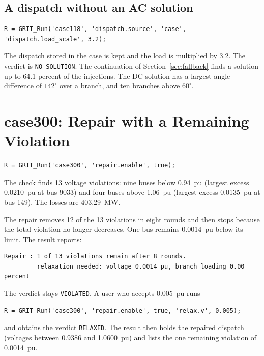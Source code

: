 \documentclass[a4paper,11pt]{article}
\begin{document}
\subsection{A dispatch without an AC solution}

\begin{lstlisting}
R = GRIT_Run('case118', 'dispatch.source', 'case', 'dispatch.load_scale', 3.2);
\end{lstlisting}

The dispatch stored in the case is kept and the load is multiplied by 3.2. The verdict is \texttt{NO\_SOLUTION}. The continuation of Section~\ref{sec:fallback} finds a solution up to 64.1 percent of the injections. The DC solution has a largest angle difference of $142^\circ$ over a branch, and ten branches above $60^\circ$.

\section{case300: Repair with a Remaining Violation}\label{sec:ex300}

\begin{lstlisting}
R = GRIT_Run('case300', 'repair.enable', true);
\end{lstlisting}

The check finds 13 voltage violations: nine buses below 0.94~pu (largest excess 0.0210~pu at bus 9033) and four buses above 1.06~pu (largest excess 0.0135~pu at bus 149). The losses are 403.29~MW.

The repair removes 12 of the 13 violations in eight rounds and then stops because the total violation no longer decreases. One bus remains 0.0014~pu below its limit. The result reports:

\begin{lstlisting}[numbers=none]
Repair : 1 of 13 violations remain after 8 rounds.
         relaxation needed: voltage 0.0014 pu, branch loading 0.00 percent
\end{lstlisting}

The verdict stays \texttt{VIOLATED}. A user who accepts 0.005~pu runs

\begin{lstlisting}
R = GRIT_Run('case300', 'repair.enable', true, 'relax.v', 0.005);
\end{lstlisting}

and obtains the verdict \texttt{RELAXED}. The result then holds the repaired dispatch (voltages between 0.9386 and 1.0600~pu) and lists the one remaining violation of 0.0014~pu.
\end{document}
